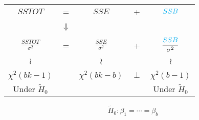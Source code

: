\begin{frame}[fragile]
	\begin{center}
		\begin{tabular}{ccccc}
			$\displaystyle SSTOT$ &
			= &
			$\displaystyle SSE$ &
			+ &
			$\displaystyle \textcolor{cyan}{SSB}$ \\ \\
			  &$\Downarrow$&&& \\ \\
			$\displaystyle \frac{SSTOT}{\sigma^2}$ &
			= &
			$\displaystyle \frac{SSE}{\sigma^2}$ &
			+ &
			$\displaystyle \frac{\textcolor{cyan}{SSB}}{\sigma^2}$ \\ \\
			$\wr$&& $\wr$ &  & $\wr$ \\ \\
			$\chi^2(bk-1)$ && $\chi^2(bk-b)$ & $\perp$ & $\chi^2(b-1)$
			\\[2em]
			Under $\widetilde H_0$& & \checkmark && Under $\widetilde H_0$
		\end{tabular}
		\vfill
		\[
		\widetilde H_0 : \beta_1=\cdots = \beta_b
		\]
	\end{center}
\end{frame}
